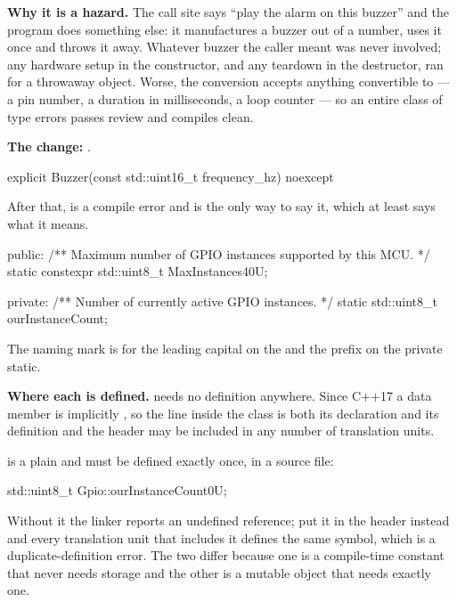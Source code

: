 \textbf{Why it is a hazard.} The call site says ``play the alarm on this buzzer'' and the program
does something else: it manufactures a buzzer out of a number, uses it once and throws it away.
Whatever buzzer the caller meant was never involved; any hardware setup in the constructor, and any
teardown in the destructor, ran for a throwaway object. Worse, the conversion accepts anything
convertible to  --- a pin number, a duration in milliseconds, a loop counter ---
so an entire class of type errors passes review and compiles clean. 

\textbf{The change:} .

\begin{cppcode}
explicit Buzzer(const std::uint16_t frequency_hz) noexcept
\end{cppcode}

\noindent After that,  is a compile error and 
is the only way to say it, which at least says what it means. 

\begin{cppcode}
public:
    /** Maximum number of GPIO instances supported by this MCU. */
    static constexpr std::uint8_t MaxInstances{40U};

private:
    /** Number of currently active GPIO instances. */
    static std::uint8_t ourInstanceCount;
\end{cppcode}

\noindent The naming mark is for the leading capital on the  and the
 prefix on the private static.

\textbf{Where each is defined.}  needs no definition anywhere. Since C++17 a
 data member is implicitly , so the line inside the class is both
its declaration and its definition and the header may be included in any number of translation
units.

 is a plain  and must be defined exactly once, in a source file:

\begin{cppcode}
std::uint8_t Gpio::ourInstanceCount{0U};
\end{cppcode}

\noindent Without it the linker reports an undefined reference; put it in the header instead and
every translation unit that includes it defines the same symbol, which is a duplicate-definition
error. The two differ because one is a compile-time constant that never needs storage and the other
is a mutable object that needs exactly one. 

